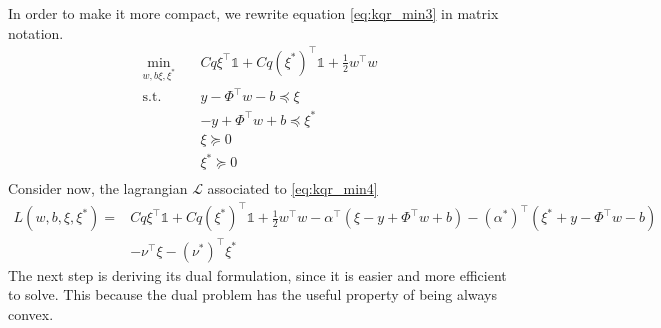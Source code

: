 In order to make it more compact, we rewrite equation \ref{eq:kqr_min3} in matrix notation.
\begin{equation}\label{eq:kqr_min4}
    \begin{aligned}
        \min_{w,b\xi,\xi^*} \quad & C q \xi^\intercal \mathbb{1}+ C q (\xi^*)^\intercal \mathbb{1}+ \frac{1}{2}w^\intercal w\\
    \textrm{s.t.} \quad & y-\Phi^\intercal w -b \preceq \xi\\
    & -y+\Phi^\intercal w +b \preceq \xi^*\\
      &\xi\succeq0    \\
      &\xi^*\succeq0    \\
    \end{aligned}
    \end{equation}
Consider now, the lagrangian $\mathcal{L}$ associated to \ref{eq:kqr_min4}
\begin{equation}\label{eq:kqr_min5}
    \begin{aligned}
    L(w,b,\xi,\xi^*)= & C q \xi^\intercal \mathbb{1}+ C q (\xi^*)^\intercal \mathbb{1}+ \frac{1}{2}w^\intercal w- \alpha^\intercal(\xi - y+\Phi^\intercal w +b)
    - (\alpha^*)^\intercal(\xi^* +y-\Phi^\intercal w -b)
    \\
    & -\nu^\intercal \xi - (\nu^*)^\intercal \xi^*
\end{aligned}
\end{equation}
The next step is deriving its dual formulation, since it is easier and more efficient to solve. This because the dual problem has the useful property of being always convex.

